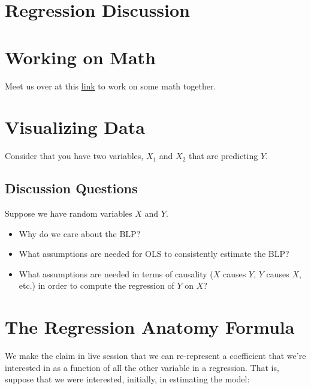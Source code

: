 \documentclass[
]{book}
\providecommand{\tightlist}{%
  \setlength{\itemsep}{0pt}\setlength{\parskip}{0pt}}
\theoremstyle{definition}
\theoremstyle{definition}
\theoremstyle{definition}
\theoremstyle{definition}
\theoremstyle{remark}
\begin{document}
\hypertarget{regression-discussion}{%
\section{Regression Discussion}\label{regression-discussion}}

\hypertarget{working-on-math}{%
\section{Working on Math}\label{working-on-math}}

Meet us over at this \href{https://miro.com/welcomeonboard/OWZ3SHlpeVBMYjdnc2xXUFhzQVNWaFpnTkg2dmF1Z3I1UUJBWVZobWFOeVduSHJNTTRSQUt3akVyQUt0MnAyM3wzNDU4NzY0NTE4MDA4MjA1NTc3?invite_link_id=319921528710}{link} to work on some math together.

\hypertarget{visualizing-data}{%
\section{Visualizing Data}\label{visualizing-data}}

Consider that you have two variables, \(X_{1}\) and \(X_{2}\) that are predicting \(Y\).

\hypertarget{discussion-questions-1}{%
\subsection{Discussion Questions}\label{discussion-questions-1}}

Suppose we have random variables \(X\) and \(Y\).

\begin{itemize}
\tightlist
\item
  Why do we care about the BLP?
\item
  What assumptions are needed for OLS to consistently estimate the BLP?
\item
  What assumptions are needed in terms of causality (\(X\) causes \(Y\), \(Y\) causes \(X\), etc.) in order to compute the regression of \(Y\) on \(X\)?
\end{itemize}

\hypertarget{the-regression-anatomy-formula}{%
\section{The Regression Anatomy Formula}\label{the-regression-anatomy-formula}}

We make the claim in live session that we can re-represent a coefficient that we're interested in as a function of all the other variable in a regression. That is, suppose that we were interested, initially, in estimating the model:
\end{document}
